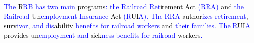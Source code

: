 \begin{tcolorbox}
    \textcolor{blue}{The} \textcolor{black}{R}\textcolor{blue}{R}\textcolor{blue}{B} \textcolor{blue}{has} \textcolor{blue}{two} \textcolor{blue}{main} \textcolor{black}{programs}\textcolor{blue}{:} \textcolor{blue}{the} \textcolor{blue}{Rail}\textcolor{blue}{road} \textcolor{blue}{Ret}\textcolor{black}{irement} \textcolor{black}{Act} \textcolor{blue}{(}\textcolor{blue}{R}\textcolor{blue}{RA}\textcolor{blue}{)} \textcolor{black}{and} \textcolor{blue}{the} \textcolor{blue}{Rail}\textcolor{blue}{road} \textcolor{black}{Un}\textcolor{blue}{emp}\textcolor{blue}{loyment} \textcolor{blue}{In}\textcolor{blue}{sur}\textcolor{blue}{ance} \textcolor{black}{Act} \textcolor{blue}{(}\textcolor{blue}{R}\textcolor{black}{UI}\textcolor{blue}{A}\textcolor{blue}{).} \textcolor{blue}{The} \textcolor{blue}{R}\textcolor{blue}{RA} \textcolor{black}{author}\textcolor{blue}{izes} \textcolor{blue}{ret}\textcolor{blue}{irement}\textcolor{black}{,} \textcolor{black}{surv}\textcolor{blue}{iv}\textcolor{blue}{or}\textcolor{blue}{,} \textcolor{blue}{and} \textcolor{blue}{dis}\textcolor{black}{ability} \textcolor{blue}{benefits} \textcolor{blue}{for} \textcolor{blue}{rail}\textcolor{blue}{road} \textcolor{blue}{workers} \textcolor{black}{and} \textcolor{blue}{their} \textcolor{blue}{families}\textcolor{blue}{.} \textcolor{blue}{The} \textcolor{blue}{R}\textcolor{black}{UI}\textcolor{blue}{A} \textcolor{black}{provides} \textcolor{black}{un}\textcolor{blue}{emp}\textcolor{blue}{loyment} \textcolor{blue}{and} \textcolor{black}{sick}\textcolor{blue}{ness} \textcolor{blue}{benefits} \textcolor{blue}{for} \textcolor{blue}{rail}\textcolor{blue}{road} \textcolor{black}{workers}\textcolor{blue}{.}
    

\end{tcolorbox}
